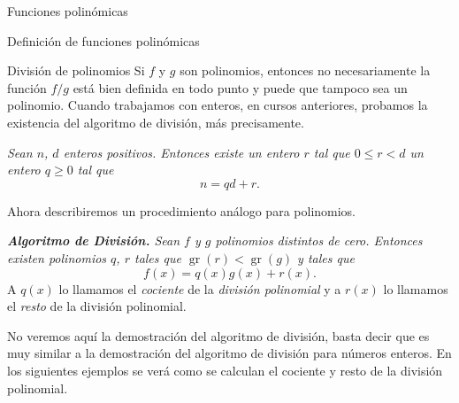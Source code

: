 \begin{chapter}{Funciones polinómicas}
\begin{section}{Definición de funciones polinómicas}
 \end{section}


 \begin{section}{División de polinomios}\label{seccion-division-de-polinomios} Si $f$ y $g$ son polinomios,  entonces no necesariamente la función $f/g$ está bien definida en todo punto y puede que tampoco sea un polinomio. Cuando trabajamos con enteros, en cursos anteriores,  probamos la existencia del algoritmo de división, más precisamente.

    \textit{Sean $n$, $d$ enteros positivos. Entonces existe un entero $r$ tal que
        $0 \le  r <d$  un entero $q \ge 0$ tal que
    }
    \begin{equation*}
        n = qd + r.
    \end{equation*}

    Ahora describiremos un procedimiento análogo para polinomios.

    \textit{\textbf{Algoritmo de División.} Sean $f$ y $g$ polinomios distintos de cero. Entonces existen polinomios $q$, $r$ tales que $\operatorname{gr}(r) < \operatorname{gr}(g)$ y tales que}
    \begin{equation*}
        f (x) = q (x) g (x) + r (x).
    \end{equation*}
    A $q(x)$ lo llamamos el \textit{cociente} de la \textit{división polinomial} y  a $r(x)$ lo llamamos el \textit{resto}  de la división polinomial.

    No veremos aquí la demostración del algoritmo de división, basta decir que es muy similar a  la demostración del algoritmo de división para números enteros. En los siguientes ejemplos se verá como se calculan el cociente y resto de la división polinomial.


\end{section}
\end{chapter}
